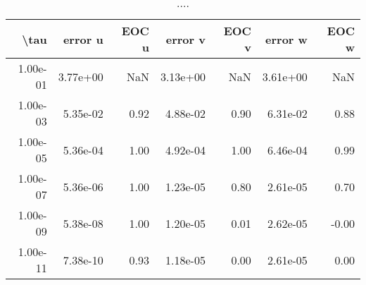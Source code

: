 \begin{table}[ht]
\centering
\begin{tabular}{rrrrrrr}
  \hline
  \textbf{\textbackslash{}tau} & \textbf{error u} & \textbf{EOC u} & \textbf{error v} & \textbf{EOC v} & \textbf{error w} & \textbf{EOC w} \\\hline
  1.00e-01 & 3.77e+00 & NaN & 3.13e+00 & NaN & 3.61e+00 & NaN \\
  1.00e-03 & 5.35e-02 & 0.92 & 4.88e-02 & 0.90 & 6.31e-02 & 0.88 \\
  1.00e-05 & 5.36e-04 & 1.00 & 4.92e-04 & 1.00 & 6.46e-04 & 0.99 \\
  1.00e-07 & 5.36e-06 & 1.00 & 1.23e-05 & 0.80 & 2.61e-05 & 0.70 \\
  1.00e-09 & 5.38e-08 & 1.00 & 1.20e-05 & 0.01 & 2.62e-05 & -0.00 \\
  1.00e-11 & 7.38e-10 & 0.93 & 1.18e-05 & 0.00 & 2.61e-05 & 0.00 \\\hline
\end{tabular}
\caption{....}
\end{table}
